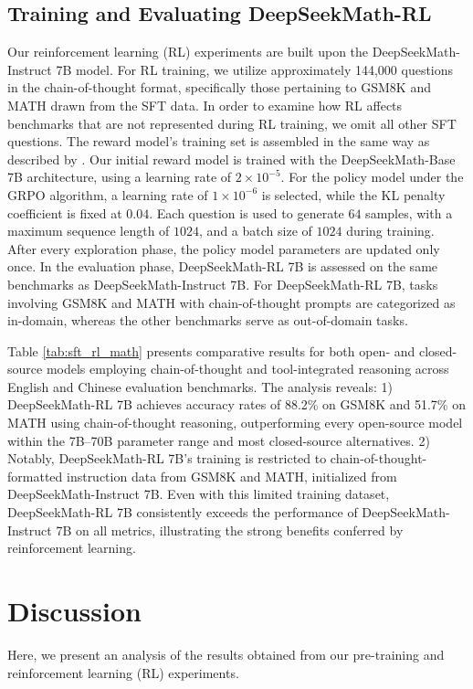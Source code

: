 \begin{itemize}[topsep=0pt]
\subsection{Training and Evaluating DeepSeekMath-RL}

Our reinforcement learning (RL) experiments are built upon the DeepSeekMath-Instruct 7B model. For RL training, we utilize approximately 144,000 questions in the chain-of-thought format, specifically those pertaining to GSM8K and MATH drawn from the SFT data. In order to examine how RL affects benchmarks that are not represented during RL training, we omit all other SFT questions. The reward model's training set is assembled in the same way as described by \citep{wang2023math}. Our initial reward model is trained with the DeepSeekMath-Base 7B architecture, using a learning rate of $2 \times 10^{-5}$. For the policy model under the GRPO algorithm, a learning rate of $1 \times 10^{-6}$ is selected, while the KL penalty coefficient is fixed at $0.04$. Each question is used to generate $64$ samples, with a maximum sequence length of $1024$, and a batch size of $1024$ during training. After every exploration phase, the policy model parameters are updated only once. In the evaluation phase, DeepSeekMath-RL 7B is assessed on the same benchmarks as DeepSeekMath-Instruct 7B. For DeepSeekMath-RL 7B, tasks involving GSM8K and MATH with chain-of-thought prompts are categorized as in-domain, whereas the other benchmarks serve as out-of-domain tasks.

Table \ref{tab:sft_rl_math} presents comparative results for both open- and closed-source models employing chain-of-thought and tool-integrated reasoning across English and Chinese evaluation benchmarks. The analysis reveals: 1) DeepSeekMath-RL 7B achieves accuracy rates of 88.2\% on GSM8K and 51.7\% on MATH using chain-of-thought reasoning, outperforming every open-source model within the 7B–70B parameter range and most closed-source alternatives. 2) Notably, DeepSeekMath-RL 7B’s training is restricted to chain-of-thought-formatted instruction data from GSM8K and MATH, initialized from DeepSeekMath-Instruct 7B. Even with this limited training dataset, DeepSeekMath-RL 7B consistently exceeds the performance of DeepSeekMath-Instruct 7B on all metrics, illustrating the strong benefits conferred by reinforcement learning.

\section{Discussion}
Here, we present an analysis of the results obtained from our pre-training and reinforcement learning (RL) experiments.


\end{itemize}
